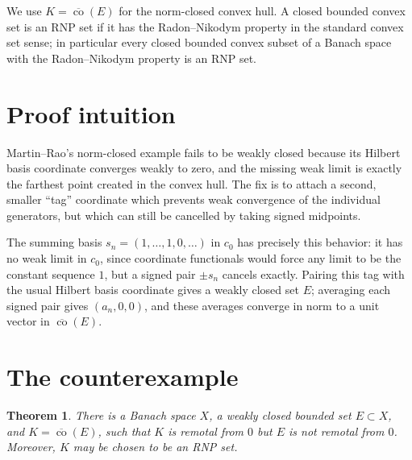 \documentclass[11pt]{article}
\newtheorem{theorem}{Theorem}
\newcommand{\clco}{\overline{\operatorname{co}}}
\begin{document}
We use \(K=\clco(E)\) for the norm-closed convex hull.  A closed bounded convex
set is an RNP set if it has the Radon--Nikodym property in the standard convex
set sense; in particular every closed bounded convex subset of a Banach space
with the Radon--Nikodym property is an RNP set.

\section*{Proof intuition}

Martin--Rao's norm-closed example fails to be weakly closed because its Hilbert
basis coordinate converges weakly to zero, and the missing weak limit is
exactly the farthest point created in the convex hull.  The fix is to attach a
second, smaller ``tag'' coordinate which prevents weak convergence of the
individual generators, but which can still be cancelled by taking signed
midpoints.

The summing basis \(s_n=(1,\ldots,1,0,\ldots)\) in \(c_0\) has precisely this
behavior: it has no weak limit in \(c_0\), since coordinate functionals would
force any limit to be the constant sequence \(1\), but a signed pair
\(\pm s_n\) cancels exactly.  Pairing this tag with the usual Hilbert basis
coordinate gives a weakly closed set \(E\); averaging each signed pair gives
\((a_n,0,0)\), and these averages converge in norm to a unit vector in
\(\clco(E)\).

\section*{The counterexample}

\begin{theorem}
There is a Banach space \(X\), a weakly closed bounded set \(E\subset X\), and
\(K=\clco(E)\), such that \(K\) is remotal from \(0\) but \(E\) is not remotal
from \(0\).  Moreover, \(K\) may be chosen to be an RNP set.
\end{theorem}
\end{document}
